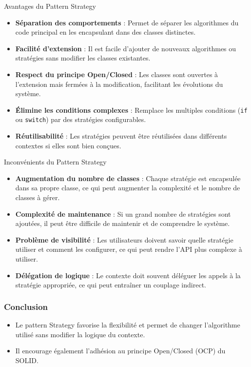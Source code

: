 \documentclass[aspectratio=169]{beamer}
\begin{document}
  \begin{frame}{Avantages du Pattern Strategy}
    \begin{itemize}
        \item \textbf{Séparation des comportements} : Permet de séparer les algorithmes du code principal en les encapsulant dans des classes distinctes.
        \item \textbf{Facilité d'extension} : Il est facile d'ajouter de nouveaux algorithmes ou stratégies sans modifier les classes existantes.
        \item \textbf{Respect du principe Open/Closed} : Les classes sont ouvertes à l'extension mais fermées à la modification, facilitant les évolutions du système.
        \item \textbf{Élimine les conditions complexes} : Remplace les multiples conditions (\texttt{if} ou \texttt{switch}) par des stratégies configurables.
        \item \textbf{Réutilisabilité} : Les stratégies peuvent être réutilisées dans différents contextes si elles sont bien conçues.
    \end{itemize}
  \end{frame}

  \begin{frame}{Inconvénients du Pattern Strategy}
    \begin{itemize}
        \item \textbf{Augmentation du nombre de classes} : Chaque stratégie est encapsulée dans sa propre classe, ce qui peut augmenter la complexité et le nombre de classes à gérer.
        \item \textbf{Complexité de maintenance} : Si un grand nombre de stratégies sont ajoutées, il peut être difficile de maintenir et de comprendre le système.
        \item \textbf{Problème de visibilité} : Les utilisateurs doivent savoir quelle stratégie utiliser et comment les configurer, ce qui peut rendre l'API plus complexe à utiliser.
        \item \textbf{Délégation de logique} : Le contexte doit souvent déléguer les appels à la stratégie appropriée, ce qui peut entraîner un couplage indirect.
    \end{itemize}
  \end{frame}

  \begin{frame}
    \frametitle{Conclusion}
    \begin{itemize}
        \item Le pattern Strategy favorise la flexibilité et permet de changer l'algorithme utilisé sans modifier la logique du contexte.
        \item Il encourage également l'adhésion au principe Open/Closed (OCP) du SOLID.
    \end{itemize}
  \end{frame}
\end{document}
